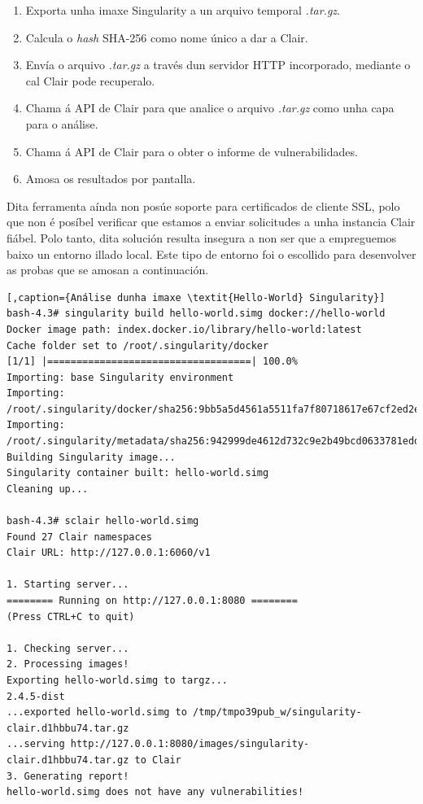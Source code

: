 \begin{enumerate}
    \item Exporta unha imaxe Singularity a un arquivo temporal \textit{.tar.gz}.
    \item Calcula o \textit{hash} \gls{SHA}-256 como nome único a dar a Clair.
    \item Envía o arquivo \textit{.tar.gz} a través dun servidor \gls{HTTP} incorporado, mediante o cal Clair pode recuperalo.
    \item Chama á \gls{API} de Clair para que analice o arquivo \textit{.tar.gz} como unha capa para o análise.
    \item Chama á \gls{API} de Clair para o obter o informe de vulnerabilidades.
    \item Amosa os resultados por pantalla.
\end{enumerate}

Dita ferramenta aínda non posúe soporte para certificados de cliente \gls{SSL}, polo que non é posíbel verificar que estamos a enviar solicitudes a unha instancia Clair fiábel. Polo tanto, dita solución resulta insegura a non ser que a empreguemos baixo un entorno illado local. Este tipo de entorno foi o escollido para desenvolver as probas que se amosan a continuación.

\begin{lstlisting}[,caption={Análise dunha imaxe \textit{Hello-World} Singularity}]
bash-4.3# singularity build hello-world.simg docker://hello-world
Docker image path: index.docker.io/library/hello-world:latest
Cache folder set to /root/.singularity/docker
[1/1] |===================================| 100.0% 
Importing: base Singularity environment
Importing: /root/.singularity/docker/sha256:9bb5a5d4561a5511fa7f80718617e67cf2ed2e6cdcd02e31be111a8d0ac4d6b7.tar.gz
Importing: /root/.singularity/metadata/sha256:942999de4612d732c9e2b49bcd0633781edd5f3bd457d5f4f6cdc965b1abef9e.tar.gz
Building Singularity image...
Singularity container built: hello-world.simg
Cleaning up...

bash-4.3# sclair hello-world.simg 
Found 27 Clair namespaces
Clair URL: http://127.0.0.1:6060/v1

1. Starting server...
======== Running on http://127.0.0.1:8080 ========
(Press CTRL+C to quit)

1. Checking server...
2. Processing images!
Exporting hello-world.simg to targz...
2.4.5-dist
...exported hello-world.simg to /tmp/tmpo39pub_w/singularity-clair.d1hbbu74.tar.gz
...serving http://127.0.0.1:8080/images/singularity-clair.d1hbbu74.tar.gz to Clair
3. Generating report!
hello-world.simg does not have any vulnerabilities!
\end{lstlisting}


